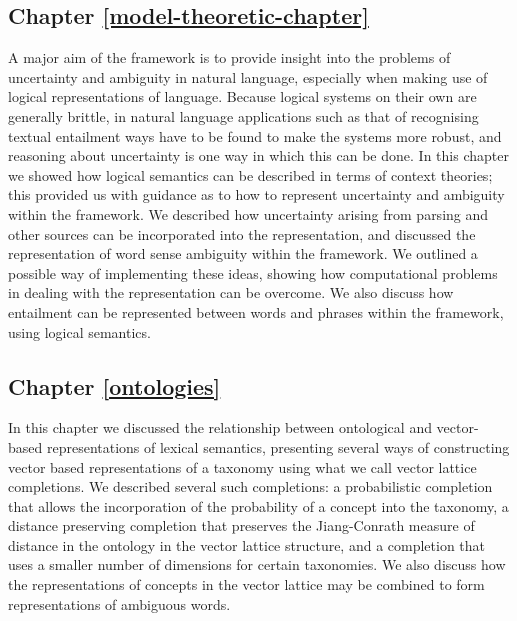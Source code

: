 \subsection*{Chapter \ref{model-theoretic-chapter}}

A major aim of the framework is to provide insight into the problems of uncertainty and ambiguity in natural language, especially when making use of logical representations of language. Because logical systems on their own are generally brittle, in natural language applications such as that of recognising textual entailment ways have to be found to make the systems more robust, and reasoning about uncertainty is one way in which this can be done. In this chapter we showed how logical semantics can be described in terms of context theories; this provided us with guidance as to how to represent uncertainty and ambiguity within the framework. We described how uncertainty arising from parsing and other sources can be incorporated into the  representation, and discussed the representation of word sense ambiguity within the framework. We outlined a possible way of implementing these ideas, showing how computational problems in dealing with the representation can be overcome. We also discuss how entailment can be represented between words and phrases within the framework, using logical semantics.


\subsection*{Chapter \ref{ontologies}}

In this chapter we discussed the relationship between ontological and vector-based representations of lexical semantics, presenting several ways of constructing vector based representations of a taxonomy using what we call vector lattice completions. We described several such completions: a probabilistic completion that allows the incorporation of the probability of a concept into the taxonomy, a distance preserving completion that preserves the Jiang-Conrath measure of distance in the ontology in the vector lattice structure, and a completion that uses a smaller number of dimensions for certain taxonomies. We also discuss how the representations of concepts in the vector lattice may be combined to form representations of ambiguous words.

